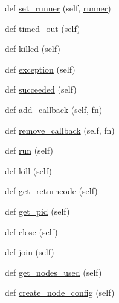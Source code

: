 \begin{DoxyCompactItemize}
\item 
def \hyperlink{classcodar_1_1savanna_1_1model_1_1_run_aac3822b6e9166a3c2c5ea7906d89ece9}{set\+\_\+runner} (self, \hyperlink{classcodar_1_1savanna_1_1model_1_1_run_a4e689edb49d16bcae268fbda092bbe9c}{runner})
\item 
def \hyperlink{classcodar_1_1savanna_1_1model_1_1_run_a3d5293dbe910c5e940e71ceeeb82778d}{timed\+\_\+out} (self)
\item 
def \hyperlink{classcodar_1_1savanna_1_1model_1_1_run_abf7413759a4e4d456e978e5bade25e02}{killed} (self)
\item 
def \hyperlink{classcodar_1_1savanna_1_1model_1_1_run_a3e764a9c156037997b107a268716cf7e}{exception} (self)
\item 
def \hyperlink{classcodar_1_1savanna_1_1model_1_1_run_a5b08f9604e4010ab32059e3291448cda}{succeeded} (self)
\item 
def \hyperlink{classcodar_1_1savanna_1_1model_1_1_run_a73899dead2dbe21ee0242edf9e21515d}{add\+\_\+callback} (self, fn)
\item 
def \hyperlink{classcodar_1_1savanna_1_1model_1_1_run_a470a9f2082dcf6244fdf330dc8dc7990}{remove\+\_\+callback} (self, fn)
\item 
def \hyperlink{classcodar_1_1savanna_1_1model_1_1_run_a90816a0d12240402ca7b5754ffc44242}{run} (self)
\item 
def \hyperlink{classcodar_1_1savanna_1_1model_1_1_run_a734d77c85281aa6b2d76ec798575c52b}{kill} (self)
\item 
def \hyperlink{classcodar_1_1savanna_1_1model_1_1_run_ad58affb918ea0222f8e53196b68f6f86}{get\+\_\+returncode} (self)
\item 
def \hyperlink{classcodar_1_1savanna_1_1model_1_1_run_a996441976a9c4facd1c4de9eb32be24a}{get\+\_\+pid} (self)
\item 
def \hyperlink{classcodar_1_1savanna_1_1model_1_1_run_a079f9410453bd7459a8d0acdc891c6cf}{close} (self)
\item 
def \hyperlink{classcodar_1_1savanna_1_1model_1_1_run_a9f413d6685194f969cc686f6e829d8a9}{join} (self)
\item 
def \hyperlink{classcodar_1_1savanna_1_1model_1_1_run_a3b135416fb501328bba834045d2265b0}{get\+\_\+nodes\+\_\+used} (self)
\item 
def \hyperlink{classcodar_1_1savanna_1_1model_1_1_run_a1c7234a57ae8bcb81fdec643f3825b31}{create\+\_\+node\+\_\+config} (self)
\end{DoxyCompactItemize}
